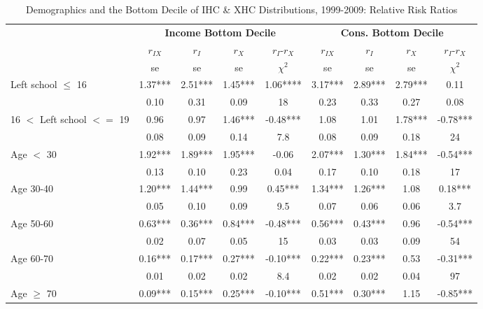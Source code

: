 \begin{table}
\caption{Demographics and the Bottom Decile of IHC \& XHC Distributions, 1999-2009: Relative Risk Ratios}
\centering
\begin{tabular}{l|cccc|cccc}
\hline\hline 
	& \multicolumn{4}{c}{\textbf{Income Bottom Decile}} &  \multicolumn{4}{c}{\textbf{Cons. Bottom Decile}} \\
	&	$r_{IX}$	&	$r_{I}$	&	$r_{X}$ &	$r_{I}$-$r_{X}$&	$r_{IX}$	&	$r_{I}$	&	$r_{X}$	&	$r_{I}$-$r_{X}$\\
  & se & se & se  & $\chi^{2}$ & se & se & se & $\chi^{2}$ \\
\hline
Left school $\leq$ 16	&	       1.37***  	&	       2.51***	&	      1.45***	&	1.06****	&	     					  3.17***	&	       2.89***	&	2.79***	&	0.11	\\
                   		 	&	       0.10  	&	0.31	&	0.09	&	18	&	      
						 0.23   	&	0.33	&	0.27	&	0.08	\\
16 $<$ Left school $<=$ 19	&	       0.96   	&	       0.97  	&	1.46***	&	-0.48***	&	
				       1.08   	&	       1.01  	&	       1.78***  	&	-0.78***	\\
                    		&	       0.08   	&	0.09	&	0.14	&	7.8	&	     
					  0.08   	&	0.09	&	0.18	&	24	\\
Age $<$ 30	&	       1.92*** 	&	       1.89***  	&	1.95***	&	-0.06	&	
			       2.07***  	&	1.30***	&	1.84***	&	-0.54***	\\
                    	&	       0.13   	&	0.10	&	0.23	&	0.04	&	  
			     0.17   	&	0.10	&	0.18	&	17	\\
Age 30-40	&	      1.20***   	&	       1.44***	&	       0.99 	&	0.45***	&	
			       1.34***   	&	       1.26***	&	1.08	&	0.18***	\\
                    	&	       0.05   	&	0.10	&	0.09	&	9.5	&	  
			     0.07   	&	0.06	&	0.06	&	3.7	\\
Age 50-60	&	       0.63***	&	       0.36***	&	0.84***	&	-0.48***	&
			       0.56***	&	       0.43***	&	       0.96 	&	-0.54***	\\
                    	&	       0.02   	&	0.07	&	0.05	&	15	&	
			       0.03   	&	0.03	&	0.09	&	54	\\
Age 60-70	&	       0.16***	&	       0.17***	&	       0.27***	&	-0.10***	&	       								0.22***	&	       0.23***	&	0.53	&	-0.31***	\\
                    	&	       0.01   	&	0.02	&	0.02	&	8.4	&	
			       0.02   	&	0.02	&	0.04	&	97	\\
Age $\geq$ 70	&	       0.09***	&	       0.15***	&	       0.25***	&	-0.10***	&	    					   		0.51***	&	       0.30***	&	       1.15 	&	-0.85***	\\

\end{tabular}
\end{table}
